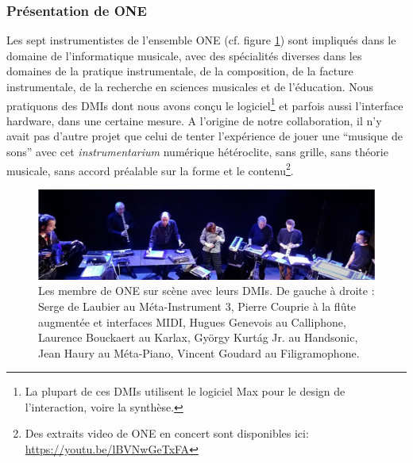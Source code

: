 \subsubsection{Présentation de ONE}
\noindent Les sept instrumentistes de l'ensemble ONE (cf. figure \ref{fig:notation:one-fullband}) sont impliqués dans le domaine de l'informatique musicale, avec des spécialités diverses dans les domaines de la pratique instrumentale, de la composition, de la facture instrumentale, de la recherche en sciences musicales et de l'éducation. Nous pratiquons des \glspl{DMI} dont nous avons conçu le logiciel\footnote{La plupart de ces \glspl{DMI} utilisent le logiciel Max pour le design de l'interaction, voire la synthèse.} et parfois aussi l'interface hardware, dans une certaine mesure.
A l'origine de notre collaboration, il n'y avait pas d'autre projet que celui de tenter l'expérience de jouer une ``musique de sons'' avec cet \textit{instrumentarium} numérique hétéroclite, sans grille, sans théorie musicale, sans accord préalable sur la forme et le contenu\footnote{Des extraits video de ONE en concert sont disponibles ici: \url{https://youtu.be/lBVNwGeTxFA}}.
\begin{figure}[!htbp]
	\captionsetup{format=plain}%
	\includegraphics[width=\textwidth]{gfx/notation/ONE-fullBand.png}
	\caption[Les membres de ONE et leurs DMIs]{Les membre de ONE sur scène avec leurs \glspl{DMI}. De gauche à droite : Serge de Laubier au Méta-Instrument 3, Pierre Couprie à la flûte augmentée et interfaces MIDI, Hugues Genevois au Calliphone, Laurence Bouckaert au Karlax, György Kurtág Jr. au Handsonic, Jean Haury au Méta-Piano, Vincent Goudard au Filigramophone.}
	\label{fig:notation:one-fullband}
\end{figure}

